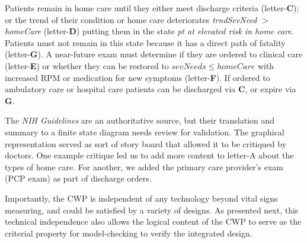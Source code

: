 Patients remain in home care until they either meet discharge criteria (letter-\textbf{C}); or the trend of their condition or home care deteriorates \emph{trndSevNeed $>$homeCare} (letter-\textbf{D}) putting them in the state \emph{pt at elevated risk in home care}.
Patients must not remain in this state because it has a direct path of fatality (letter-\textbf{G}).
A near-future exam must determine if they are ordered to clinical care (letter-\textbf{E}) or whether they can be restored to \emph{$sevNeeds\le homeCare$} with increased RPM or medication for new symptoms (letter-\textbf{F}).
If ordered to ambulatory care or hospital care patients can be discharged via \textbf{C}, or expire via \textbf{G}.

The \emph{NIH Guidelines} are an authoritative source, but their translation and summary to a finite state diagram needs review for validation. 
The graphical representation served as sort of story board that allowed it to be critiqued by doctors. 
One example critique led us to add more content to letter-A about the types of home care.  
For another, we added the primary care provider's exam (PCP exam) as part of discharge orders.

Importantly, the CWP is independent of any technology beyond vital signs measuring, and could be satisfied by a variety of designs.  
As presented next, this technical independence also allows the logical content of the CWP to serve as the criterial property for model-checking to verify the integrated design.
